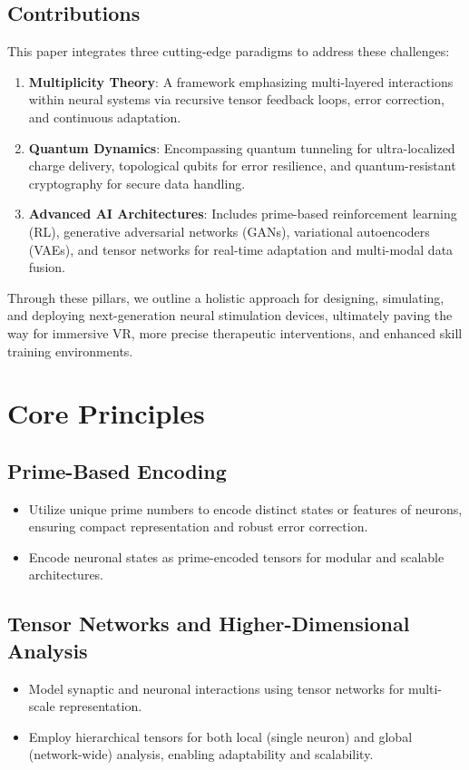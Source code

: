 \documentclass{article}
\theoremstyle{plain}
\begin{document}
\subsection{Contributions}
This paper integrates three cutting-edge paradigms to address these challenges:
\begin{enumerate}
    \item \textbf{Multiplicity Theory}: A framework emphasizing multi-layered interactions within neural systems via recursive tensor feedback loops, error correction, and continuous adaptation.
    \item \textbf{Quantum Dynamics}: Encompassing quantum tunneling for ultra-localized charge delivery, topological qubits for error resilience, and quantum-resistant cryptography for secure data handling.
    \item \textbf{Advanced AI Architectures}: Includes prime-based reinforcement learning (RL), generative adversarial networks (GANs), variational autoencoders (VAEs), and tensor networks for real-time adaptation and multi-modal data fusion.
\end{enumerate}

Through these pillars, we outline a holistic approach for designing, simulating, and deploying next-generation neural stimulation devices, ultimately paving the way for immersive VR, more precise therapeutic interventions, and enhanced skill training environments.

\section{Core Principles}

\subsection{Prime-Based Encoding}
\begin{itemize}
    \item Utilize unique prime numbers to encode distinct states or features of neurons, ensuring compact representation and robust error correction.
    \item Encode neuronal states as prime-encoded tensors for modular and scalable architectures.
\end{itemize}

\subsection{Tensor Networks and Higher-Dimensional Analysis}
\begin{itemize}
    \item Model synaptic and neuronal interactions using tensor networks for multi-scale representation.
    \item Employ hierarchical tensors for both local (single neuron) and global (network-wide) analysis, enabling adaptability and scalability.
\end{itemize}
\end{document}
